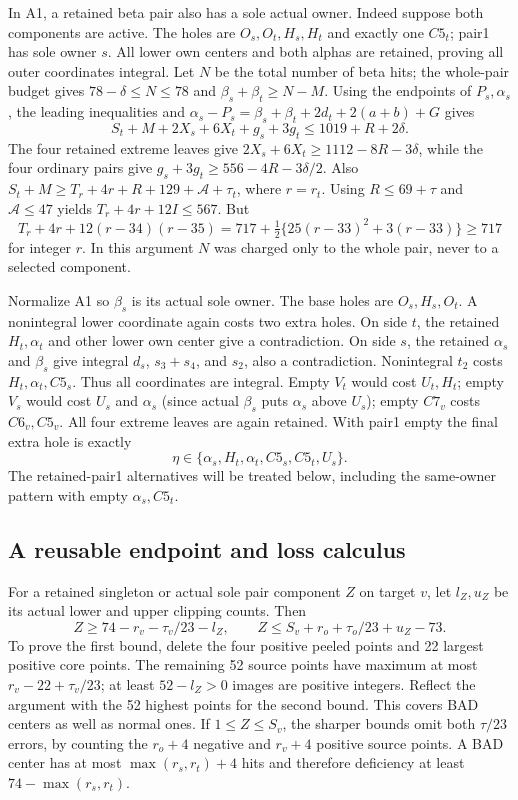 \documentclass[11pt,letterpaper]{article}
\theoremstyle{definition}\newtheorem{definition}[theorem]{Definition}
\begin{document}
In A1, a retained beta pair also has a sole actual owner. Indeed suppose
both components are active. The holes are $O_s,O_t,H_s,H_t$ and exactly
one $C5_t$; pair1 has sole owner $s$. All lower own centers and both
alphas are retained, proving all outer coordinates integral. Let $N$ be
the total number of beta hits; the whole-pair budget gives
$78-\delta\le N\le78$ and $\beta_s+\beta_t\ge N-M$.
Using the endpoints of $P_s,\alpha_s$, the leading inequalities and
$\alpha_s-P_s=\beta_s+\beta_t+2d_t+2(a+b)+G$ gives
\[
 S_t+M+2X_s+6X_t+g_s+3g_t\le1019+R+2\delta.
\]
The four retained extreme leaves give
$2X_s+6X_t\ge1112-8R-3\delta$, while the four ordinary pairs give
$g_s+3g_t\ge556-4R-3\delta/2$.
Also $S_t+M\ge T_r+4r+R+129+\mathcal A+\tau_t$, where $r=r_t$.
Using $R\le69+\tau$ and $\mathcal A\le47$ yields
$T_r+4r+12I\le567$. But
\begin{equation}\label{eq:z5-q717}
 T_r+4r+12(r-34)(r-35)
 =717+\tfrac12\{25(r-33)^2+3(r-33)\}\ge717
\end{equation}
for integer $r$. In this argument $N$ was charged only to the whole
pair, never to a selected component.

Normalize A1 so $\beta_s$ is its actual sole owner. The base holes are
$O_s,H_s,O_t$. A nonintegral lower coordinate again costs two extra
holes. On side $t$, the retained $H_t,\alpha_t$ and other lower own
center give a contradiction. On side $s$, the retained $\alpha_s$ and
$\beta_s$ give integral $d_s$, $s_3+s_4$, and $s_2$, also a
contradiction. Nonintegral $t_2$ costs $H_t,\alpha_t,C5_s$.
Thus all coordinates are integral. Empty $V_t$ would cost $U_t,H_t$;
empty $V_s$ would cost $U_s$ and $\alpha_s$ (since actual $\beta_s$
puts $\alpha_s$ above $U_s$); empty $C7_v$ costs $C6_v,C5_v$.
All four extreme leaves are again retained. With pair1 empty the final
extra hole is exactly
\begin{equation}\label{eq:z5-a1list}
 \eta\in\{\alpha_s,H_t,\alpha_t,C5_s,C5_t,U_s\}.
\end{equation}
The retained-pair1 alternatives will be treated below, including the
same-owner pattern with empty $\alpha_s,C5_t$.

\subsection{A reusable endpoint and loss calculus}
For a retained singleton or actual sole pair component $Z$ on target $v$,
let $l_Z,u_Z$ be its actual lower and upper clipping counts. Then
\begin{equation}\label{eq:z5-end}
 Z\ge74-r_v-\tau_v/23-l_Z,\qquad
 Z\le S_v+r_o+\tau_o/23+u_Z-73.
\end{equation}
To prove the first bound, delete the four positive peeled points and 22
largest positive core points. The remaining 52 source points have maximum
at most $r_v-22+\tau_v/23$; at least $52-l_Z>0$ images are positive
integers. Reflect the argument with the 52 highest points for the second
bound. This covers BAD centers as well as normal ones. If
$1\le Z\le S_v$, the sharper bounds omit both $\tau/23$ errors,
by counting the $r_o+4$ negative and $r_v+4$ positive source points.
A BAD center has at most $\max(r_s,r_t)+4$ hits and therefore deficiency
at least $74-\max(r_s,r_t)$.
\end{document}
